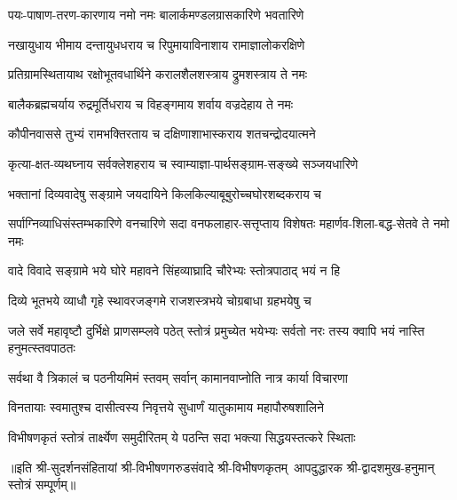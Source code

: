 \twolineshloka
{पयः-पाषाण-तरण-कारणाय नमो नमः}
{बालार्कमण्डलग्रासकारिणे भवतारिणे}

\twolineshloka
{नखायुधाय भीमाय दन्तायुधधराय च}
{रिपुमायाविनाशाय रामाज्ञालोकरक्षिणे}

\twolineshloka
{प्रतिग्रामस्थितायाथ रक्षोभूतवधार्थिने}
{करालशैलशस्त्राय द्रुमशस्त्राय ते नमः}

\twolineshloka
{बालैकब्रह्मचर्याय रुद्रमूर्तिधराय च}
{विहङ्गमाय शर्वाय वज्रदेहाय ते नमः}

\twolineshloka
{कौपीनवाससे तुभ्यं रामभक्तिरताय च}
{दक्षिणाशाभास्कराय शतचन्द्रोदयात्मने}

\twolineshloka
{कृत्या-क्षत-व्यथघ्नाय सर्वक्लेशहराय च}
{स्वाम्याज्ञा-पार्थसङ्ग्राम-सङ्ख्ये सञ्जयधारिणे}

\twolineshloka
{भक्तानां दिव्यवादेषु सङ्ग्रामे जयदायिने}
{किलकिल्याबूबुरोच्चघोरशब्दकराय च}

\threelineshloka
{सर्पाग्निव्याधिसंस्तम्भकारिणे वनचारिणे}
{सदा वनफलाहार-सत्तृप्ताय विशेषतः}
{महार्णव-शिला-बद्ध-सेतवे ते नमो नमः}

\twolineshloka
{वादे विवादे सङ्ग्रामे भये घोरे महावने}
{सिंहव्याघ्रादि चौरेभ्यः स्तोत्रपाठाद् भयं न हि}

\twolineshloka
{दिव्ये भूतभये व्याधौ गृहे स्थावरजङ्गमे}
{राजशस्त्रभये चोग्रबाधा ग्रहभयेषु च}

\threelineshloka
{जले सर्वे महावृष्टौ दुर्भिक्षे प्राणसम्प्लवे}
{पठेत् स्तोत्रं प्रमुच्येत भयेभ्यः सर्वतो नरः}
{तस्य क्वापि भयं नास्ति हनुमत्स्तवपाठतः}

\twolineshloka
{सर्वथा वै त्रिकालं च पठनीयमिमं स्तवम्}
{सर्वान् कामानवाप्नोति नात्र कार्या विचारणा}

\twolineshloka
{विनतायाः स्वमातुश्च दासीत्वस्य निवृत्तये}
{सुधार्णं यातुकामाय महापौरुषशालिने}

\twolineshloka
{विभीषणकृतं स्तोत्रं तार्क्ष्येण समुदीरितम्}
{ये पठन्ति सदा भक्त्या सिद्धयस्तत्करे स्थिताः}

॥इति श्री-सुदर्शनसंहितायां श्री-विभीषणगरुडसंवादे श्री-विभीषणकृतम्~आपदुद्धारक श्री-द्वादशमुख-हनुमान् स्तोत्रं सम्पूर्णम्॥
